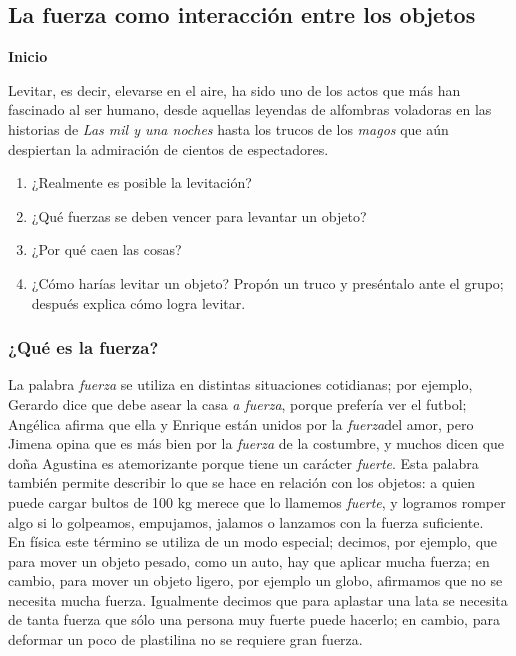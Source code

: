 \documentclass[11pt]{book}
\begin{document}
\subsection{La fuerza como interacci\'on entre los objetos}
\begin{boxK}
  \begin{center}\textbf{\color{colorrds}Inicio}\end{center}
  Levitar, es decir, elevarse en el aire, ha sido uno de los actos que más han fascinado
  al ser humano, desde aquellas leyendas de alfombras voladoras en las historias de
  \emph{Las mil y una noches} hasta los trucos de los \emph{magos} que aún despiertan la
  admiración de cientos de espectadores.
  \begin{enumerate}
    \item ¿Realmente es posible la levitación?
    \item ¿Qué fuerzas se deben vencer para levantar un objeto?
    \item ¿Por qué caen las cosas?
    \item ¿Cómo harías levitar un objeto? Propón un truco y preséntalo ante el grupo;
          después explica cómo logra levitar.
  \end{enumerate}
\end{boxK}
\subsubsection{¿Qué es la fuerza?}
La palabra \emph{fuerza} se utiliza en distintas situaciones cotidianas; por ejemplo,
Gerardo dice que debe asear la casa \emph{a fuerza}, porque prefería ver el futbol;
Angélica afirma que ella y Enrique están unidos por la \emph{fuerza}del amor, pero
Jimena opina que es más bien por la \emph{fuerza} de la costumbre, y muchos dicen que doña Agustina
es atemorizante porque tiene un carácter \emph{fuerte}. Esta palabra también permite describir
lo que se hace en relación con los objetos: a quien puede cargar bultos de 100 kg merece
que lo llamemos \emph{fuerte}, y logramos romper algo si lo golpeamos, empujamos, jalamos o
lanzamos con la fuerza suficiente. \\

En física este término se utiliza de un modo especial;
decimos, por ejemplo, que para mover un objeto pesado, como un auto, hay que aplicar mucha
fuerza; en cambio, para mover un objeto ligero, por ejemplo un globo, afirmamos que no se
necesita mucha fuerza. Igualmente decimos que para aplastar una lata se necesita de tanta
fuerza que sólo una persona muy fuerte puede hacerlo; en cambio, para deformar un poco de
plastilina no se requiere gran fuerza.\\
\end{document}

